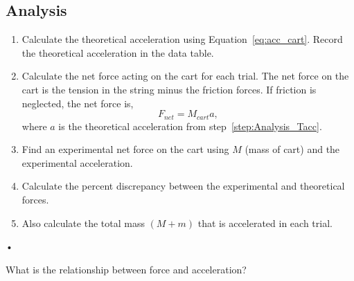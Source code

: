 \documentclass[main.tex]{subfiles}
\begin{document}
\subsection*{Analysis}
\begin{enumerate}
\item \label{step:Analysis_Tacc}
Calculate the theoretical acceleration using Equation~\eqref{eq:acc_cart}. Record the theoretical acceleration in the data table.
\item
Calculate the net force acting on the cart for each trial. The net force on the cart is the tension in the string minus the friction forces. If friction is neglected, the net force is,
\[
F_{net}=M_{cart}a,
\]
where $a$ is the theoretical acceleration from step~\ref{step:Analysis_Tacc}.
\item
Find an experimental net force on the cart using $M$ (mass of cart) and the experimental acceleration.
\item
Calculate the percent discrepancy between the experimental and theoretical forces. 
\item
Also calculate the total mass $(M+m)$ that is accelerated in each trial.
\end{enumerate}•

\begin{question}
What is the relationship between force and acceleration?
\end{question}
\end{document}
